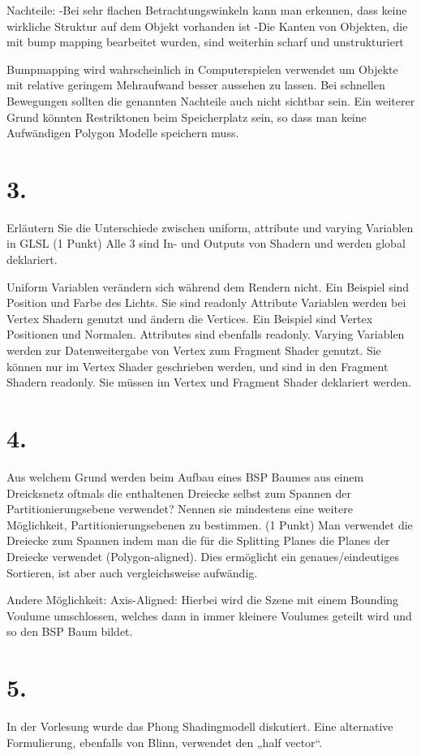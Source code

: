 \documentclass[12pt]{scrreprt}
\begin{document}
Nachteile:
-Bei sehr flachen Betrachtungswinkeln kann man erkennen, dass keine wirkliche Struktur auf dem Objekt vorhanden ist
-Die Kanten von Objekten, die mit bump mapping bearbeitet wurden, sind weiterhin scharf und unstrukturiert

Bumpmapping wird wahrscheinlich in Computerspielen verwendet um Objekte mit relative geringem Mehraufwand besser aussehen zu lassen. Bei schnellen Bewegungen sollten die genannten Nachteile auch nicht sichtbar sein. Ein weiterer Grund könnten Restriktonen beim Speicherplatz sein, so dass man keine Aufwändigen Polygon Modelle speichern muss.

\section*{3.}
Erläutern Sie die Unterschiede zwischen uniform, attribute und varying Variablen in GLSL (1 Punkt)
Alle 3 sind In- und Outputs von Shadern und werden global deklariert.

Uniform Variablen verändern sich während dem Rendern nicht. Ein Beispiel sind Position und Farbe des Lichts. Sie sind readonly
Attribute Variablen werden bei Vertex Shadern genutzt und ändern die Vertices. Ein Beispiel sind Vertex Positionen und Normalen. Attributes sind ebenfalls readonly.
Varying Variablen werden zur Datenweitergabe von Vertex zum Fragment Shader genutzt. Sie können nur im Vertex Shader geschrieben werden, und sind in den Fragment Shadern readonly. Sie müssen im Vertex und Fragment Shader deklariert werden.

\section*{4.}
Aus welchem Grund werden beim Aufbau eines BSP Baumes aus einem Dreicksnetz oftmals die enthaltenen Dreiecke selbst zum Spannen der Partitionierungsebene verwendet? Nennen sie mindestens eine weitere Möglichkeit, Partitionierungsebenen zu bestimmen. (1 Punkt)
Man verwendet die Dreiecke zum Spannen indem man die für die Splitting Planes die Planes der Dreiecke verwendet (Polygon-aligned). Dies ermöglicht ein genaues/eindeutiges Sortieren, ist aber auch vergleichsweise aufwändig.

Andere Möglichkeit: Axis-Aligned: Hierbei wird die Szene mit einem Bounding Voulume umschlossen, welches dann in immer kleinere Voulumes geteilt wird und so den BSP Baum bildet.

\section*{5.}
In der Vorlesung wurde das Phong Shadingmodell diskutiert. Eine alternative Formulierung, ebenfalls von Blinn, verwendet den „half vector“.
\end{document}
